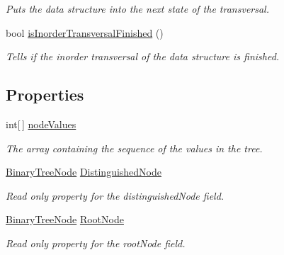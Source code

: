 \begin{DoxyCompactItemize}
\begin{DoxyCompactList}\small\item\em Puts the data structure into the next state of the transversal. \end{DoxyCompactList}\item 
bool \hyperlink{class_binary_tree_amortized_analyis_1_1_binary_tree_a1bfec2cdbb845f16ce9bf9211077e7eb}{is\+Inorder\+Transversal\+Finished} ()
\begin{DoxyCompactList}\small\item\em Tells if the inorder transversal of the data structure is finished. \end{DoxyCompactList}\end{DoxyCompactItemize}
\subsection*{Properties}
\begin{DoxyCompactItemize}
\item 
int\mbox{[}$\,$\mbox{]} \hyperlink{class_binary_tree_amortized_analyis_1_1_binary_tree_a6c23184f17d0c484533e8526b29488e3}{node\+Values}
\begin{DoxyCompactList}\small\item\em The array containing the sequence of the values in the tree. \end{DoxyCompactList}\item 
\hyperlink{class_binary_tree_amortized_analyis_1_1_binary_tree_node}{Binary\+Tree\+Node} \hyperlink{class_binary_tree_amortized_analyis_1_1_binary_tree_ab1598c045051cc8cf5b9696dbd8a8ee9}{Distinguished\+Node}
\begin{DoxyCompactList}\small\item\em Read only property for the distinguished\+Node field. \end{DoxyCompactList}\item 
\hyperlink{class_binary_tree_amortized_analyis_1_1_binary_tree_node}{Binary\+Tree\+Node} \hyperlink{class_binary_tree_amortized_analyis_1_1_binary_tree_a1a88e9a8a44b2c072ed988da7cad43ca}{Root\+Node}
\begin{DoxyCompactList}\small\item\em Read only property for the root\+Node field. \end{DoxyCompactList}\end{DoxyCompactItemize}


